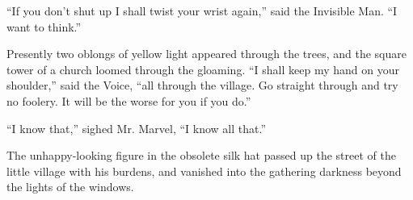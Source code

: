 “If you don’t shut up I shall twist your wrist again,” said the Invisible Man. “I want to think.”

Presently two oblongs of yellow light appeared through the trees, and the square tower of a church loomed through the gloaming. “I shall keep my hand on your shoulder,” said the Voice, “all through the village. Go straight through and try no foolery. It will be the worse for you if you do.”

“I know that,” sighed Mr. Marvel, “I know all that.”

The unhappy-looking figure in the obsolete silk hat passed up the street of the little village with his burdens, and vanished into the gathering darkness beyond the lights of the windows.